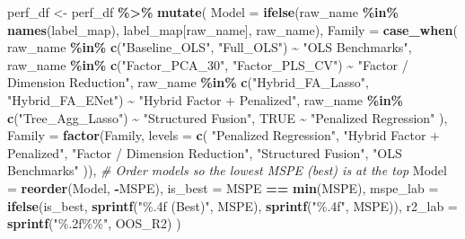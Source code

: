 \documentclass[
]{article}
\newenvironment{Shaded}{\begin{snugshade}}{\end{snugshade}}
\newcommand{\AttributeTok}[1]{\textcolor[rgb]{0.13,0.29,0.53}{#1}}
\newcommand{\CommentTok}[1]{\textcolor[rgb]{0.56,0.35,0.01}{\textit{#1}}}
\newcommand{\ConstantTok}[1]{\textcolor[rgb]{0.56,0.35,0.01}{#1}}
\newcommand{\FunctionTok}[1]{\textcolor[rgb]{0.13,0.29,0.53}{\textbf{#1}}}
\newcommand{\NormalTok}[1]{#1}
\newcommand{\OtherTok}[1]{\textcolor[rgb]{0.56,0.35,0.01}{#1}}
\newcommand{\SpecialCharTok}[1]{\textcolor[rgb]{0.81,0.36,0.00}{\textbf{#1}}}
\newcommand{\StringTok}[1]{\textcolor[rgb]{0.31,0.60,0.02}{#1}}
\begin{document}
\begin{Shaded}
\begin{Highlighting}[]
\NormalTok{perf\_df }\OtherTok{\textless{}{-}}\NormalTok{ perf\_df }\SpecialCharTok{\%\textgreater{}\%}
  \FunctionTok{mutate}\NormalTok{(}
    \AttributeTok{Model =} \FunctionTok{ifelse}\NormalTok{(raw\_name }\SpecialCharTok{\%in\%} \FunctionTok{names}\NormalTok{(label\_map), label\_map[raw\_name], raw\_name),}
    \AttributeTok{Family =} \FunctionTok{case\_when}\NormalTok{(}
\NormalTok{      raw\_name }\SpecialCharTok{\%in\%} \FunctionTok{c}\NormalTok{(}\StringTok{"Baseline\_OLS"}\NormalTok{, }\StringTok{"Full\_OLS"}\NormalTok{)                  }\SpecialCharTok{\textasciitilde{}} \StringTok{"OLS Benchmarks"}\NormalTok{,}
\NormalTok{      raw\_name }\SpecialCharTok{\%in\%} \FunctionTok{c}\NormalTok{(}\StringTok{"Factor\_PCA\_30"}\NormalTok{, }\StringTok{"Factor\_PLS\_CV"}\NormalTok{)            }\SpecialCharTok{\textasciitilde{}} \StringTok{"Factor / Dimension Reduction"}\NormalTok{,}
\NormalTok{      raw\_name }\SpecialCharTok{\%in\%} \FunctionTok{c}\NormalTok{(}\StringTok{"Hybrid\_FA\_Lasso"}\NormalTok{, }\StringTok{"Hybrid\_FA\_ENet"}\NormalTok{)         }\SpecialCharTok{\textasciitilde{}} \StringTok{"Hybrid Factor + Penalized"}\NormalTok{,}
\NormalTok{      raw\_name }\SpecialCharTok{\%in\%} \FunctionTok{c}\NormalTok{(}\StringTok{"Tree\_Agg\_Lasso"}\NormalTok{)                            }\SpecialCharTok{\textasciitilde{}} \StringTok{"Structured Fusion"}\NormalTok{,}
      \ConstantTok{TRUE}                                                         \SpecialCharTok{\textasciitilde{}} \StringTok{"Penalized Regression"}
\NormalTok{    ),}
    \AttributeTok{Family =} \FunctionTok{factor}\NormalTok{(Family, }\AttributeTok{levels =} \FunctionTok{c}\NormalTok{(}
      \StringTok{"Penalized Regression"}\NormalTok{,}
      \StringTok{"Hybrid Factor + Penalized"}\NormalTok{,}
      \StringTok{"Factor / Dimension Reduction"}\NormalTok{,}
      \StringTok{"Structured Fusion"}\NormalTok{,}
      \StringTok{"OLS Benchmarks"}
\NormalTok{    )),}
    \CommentTok{\# Order models so the lowest MSPE (best) is at the top}
    \AttributeTok{Model   =} \FunctionTok{reorder}\NormalTok{(Model, }\SpecialCharTok{{-}}\NormalTok{MSPE),}
    \AttributeTok{is\_best =}\NormalTok{ MSPE }\SpecialCharTok{==} \FunctionTok{min}\NormalTok{(MSPE),}
    \AttributeTok{mspe\_lab =} \FunctionTok{ifelse}\NormalTok{(is\_best, }\FunctionTok{sprintf}\NormalTok{(}\StringTok{"\%.4f (Best)"}\NormalTok{, MSPE), }\FunctionTok{sprintf}\NormalTok{(}\StringTok{"\%.4f"}\NormalTok{, MSPE)),}
    \AttributeTok{r2\_lab   =} \FunctionTok{sprintf}\NormalTok{(}\StringTok{"\%.2f\%\%"}\NormalTok{, OOS\_R2)}
\NormalTok{  )}


\end{Highlighting}
\end{Shaded}
\end{document}
